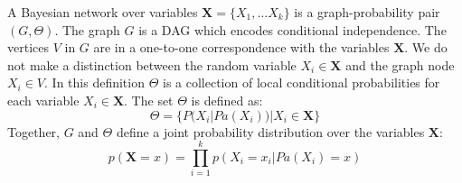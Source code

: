 \begin{defn}
A Bayesian network over variables $\textbf{X}=\{X_1,\dots X_k\}$
is a graph-probability pair $(G, \Theta)$. The graph $G$ is a DAG
which encodes conditional independence. The vertices $V$ in $G$ are
in a one-to-one correspondence with the variables $\textbf{X}$. We
do not make a distinction between the random variable $X_i \in 
\textbf{X}$ and the graph node $X_i \in V$. In this definition 
$\Theta$ is a collection of local conditional probabilities for 
each variable $X_i \in \textbf{X}$. The set $\Theta$ is defined as:
\begin{equation}
\Theta = \{P(X_i | Pa(X_i)) | X_i \in \textbf{X}\}
\end{equation}
Together, $G$ and $\Theta$ define a joint probability distribution
over the variables $\textbf{X}$:
\begin{equation}
p(\textbf{X} = x) = \prod_{i=1}^{k} p(X_i = x_i | Pa(X_i) = x)
\end{equation}
\end{defn}


